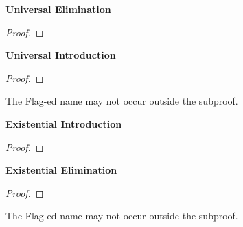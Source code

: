 \begin{multicols}{2}

\vspace{1em}\noindent\textbf{Universal Elimination}

\begin{proof}
	 
\end{proof}

\vspace{1em}\noindent\textbf{Universal Introduction}

\begin{proof}
	\open
	 \fl{}
	\close
	 
\end{proof}

\noindent The Flag-ed name  may not occur outside the subproof.

\vspace{1em}\noindent\textbf{Existential Introduction}

\begin{proof}
	 
\end{proof}

\vspace{1em}\noindent\textbf{Existential Elimination}


\begin{proof}
	\open	
		 
	\close
	 
\end{proof}

\noindent The Flag-ed name  may not occur outside the subproof.

\end{multicols}


